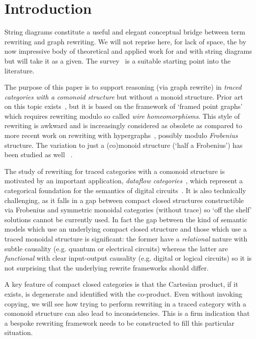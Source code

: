 \section{Introduction}

String diagrams constitute a useful and elegant conceptual bridge between term
rewriting and graph rewriting.
We will not reprise here, for lack of space, the by now impressive body of
theoretical and applied work for and with string diagrams but will take it as a
given. The survey~\cite{selinger2011survey} is a suitable starting point into
the literature.

The purpose of this paper is to support reasoning (via graph rewrite) in
\emph{traced categories with a comonoid structure} but without a monoid
structure. Prior art on this topic
exists~\cite{kissinger2012pictures,dixon2013opengraphs}, but it is based on the
framework of `framed point graphs' which requires rewriting modulo so called
\emph{wire homeomorphisms}.
This style of rewriting is awkward and is increasingly considered as obsolete as
compared to more recent work on rewriting with
hypergraphs~\cite{bonchi2022string,bonchi2022stringa,bonchi2022stringb},
possibly modulo \emph{Frobenius} structure.
The variation to just a (co)monoid structure (`half a Frobenius') has been
studied as well~ \cite{fritz2022free,milosavljevic2022string}.

The study of rewriting for traced categories with a comonoid structure is
motivated by an important application,
\emph{dataflow categories}~\cite{cazanescu1990new,cazanescu1994feedback,hasegawa1997recursion},
which represent a categorical foundation for the semantics of digital
circuits~\cite{ghica2022compositional}.
It is also technically challenging, as it falls in a gap between compact closed
structures constructible via Frobenius and symmetric monoidal categories
(without trace) so `off the shelf' solutions cannot be currently used.
In fact the gap between the kind of semantic models which use an underlying
compact closed structure and those which use a traced monoidal structure is
significant: the former have a \emph{relational} nature with subtle causality
(e.g. quantum or electrical circuits) whereas the latter are \emph{functional}
with clear input-output causality (e.g. digital or logical circuits) so it is
not surprising that the underlying rewrite frameworks should differ.

A key feature of compact closed categories is that the Cartesian product, if it
exists, is degenerate and identified with the co-product.
Even without invoking copying, we will see how trying to perform rewriting in a
traced category with a comonoid structure can also lead to inconsistencies.
This is a firm indication that a bespoke rewriting framework needs to be
constructed to fill this particular situation.

